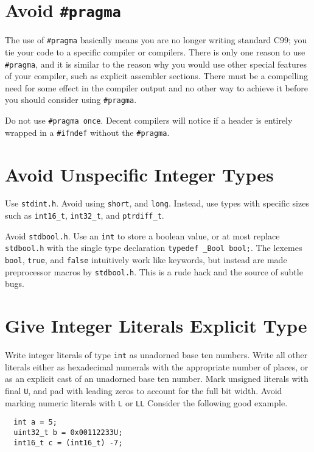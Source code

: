 \documentclass{lulu}
\newcommand{\code}[1]{\texttt{#1}\xspace}
\begin{document}
\section{Avoid \code{\#pragma}}

The use of \code{\#pragma} basically means you are no longer writing
standard C99; you tie your code to a specific compiler or compilers.
There is only one reason to use \code{\#pragma}, and it is similar to
the reason why you would use other special features of your compiler,
such as explicit assembler sections.  There must be a compelling need
for some effect in the compiler output and no other way to achieve it
before you should consider using \code{\#pragma}.

Do not use \code{\#pragma once}.  Decent compilers will notice if a
header is entirely wrapped in a \code{\#ifndef} without the
\code{\#pragma}.

\section{Avoid Unspecific Integer Types}

Use \code{stdint.h}.  Avoid using \code{short}, and \code{long}.
Instead, use types with specific sizes such as \code{int16\_t},
\code{int32\_t}, and \code{ptrdiff\_t}.

Avoid \code{stdbool.h}.  Use an \code{int} to store a boolean value,
or at most replace \code{stdbool.h} with the single type declaration
\code{typedef \_Bool bool;}.  The lexemes \code{bool}, \code{true},
and \code{false} intuitively work like keywords, but instead are made
preprocessor macros by \code{stdbool.h}.  This is a rude hack and the
source of subtle bugs.

\section{Give Integer Literals Explicit Type}

Write integer literals of type \code{int} as unadorned base ten
numbers.  Write all other literals either as hexadecimal numerals with
the appropriate number of places, or as an explicit cast of an
unadorned base ten number.  Mark unsigned literals with final
\code{U}, and pad with leading zeros to account for the full bit
width.  Avoid marking numeric literals with \code{L} or \code{LL}
Consider the following good example.

\begin{samepage}
\begin{verbatim}
  int a = 5;
  uint32_t b = 0x00112233U;
  int16_t c = (int16_t) -7;
\end{verbatim}
\end{samepage}
\end{document}
